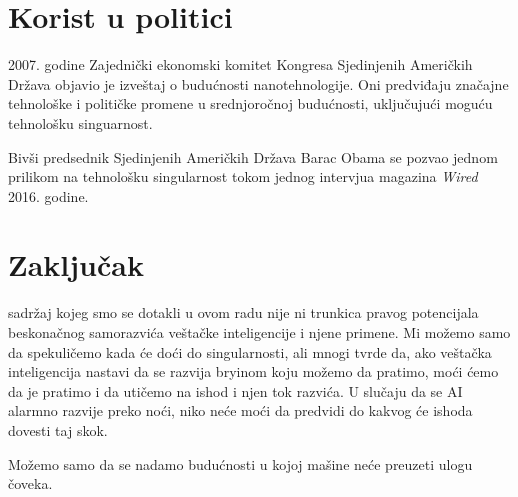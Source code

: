 \documentclass[a4paper]{article}
\begin{document}
\section{Korist u politici}
\label{sec:politika}
2007. godine Zajednički ekonomski komitet Kongresa Sjedinjenih Američkih Država objavio je izveštaj o budućnosti nanotehnologije. Oni predviđaju značajne tehnološke i političke promene u srednjoročnoj budućnosti, uključujući moguću tehnološku singuarnost.\cite{refe15}\cite{refe16}\cite{refe17}

Bivši predsednik Sjedinjenih Američkih Država Barac Obama se pozvao jednom prilikom na tehnološku singularnost tokom jednog intervjua magazina \textit{Wired} 2016. godine.\cite{refe18}
\section{Zaključak}
\label{sec:zakljucak}
sadržaj kojeg smo se dotakli u ovom radu nije ni trunkica pravog potencijala beskonačnog samorazvića veštačke inteligencije i njene primene. Mi možemo samo da spekuličemo kada će doći do singularnosti, ali mnogi tvrde da, ako veštačka inteligencija nastavi da se razvija bryinom koju možemo da pratimo, moći ćemo da je pratimo i da utičemo na ishod i njen tok razvića. U slučaju da se AI alarmno razvije preko noći, niko neće moći da predvidi do kakvog će ishoda dovesti taj skok.

Možemo samo da se nadamo budućnosti u kojoj mašine neće preuzeti ulogu čoveka.

\appendix

\end{document}
